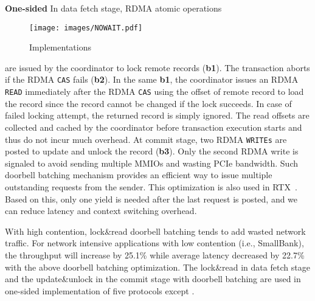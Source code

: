 {\bf One-sided }
In data fetch stage, RDMA atomic operations 
\setlength{\intextsep}{2pt}%
\setlength{\columnsep}{8pt}%
\begin{wrapfigure}[10]{r}{.50\linewidth}
    \centering
    \vspace{-0.4cm}
    \texttt{[image: images/NOWAIT.pdf]}
    \vspace{-0.8cm}
    \caption{\nowait Implementations}
     \vspace{-0.4cm}
    \label{fig:nowait}
\end{wrapfigure}
are issued by the coordinator to lock remote records (\step \textbf{b1}). The transaction aborts if the RDMA \texttt{CAS} fails (\step \textbf{b2}). In the same \step \textbf{b1}, the coordinator issues an RDMA \texttt{READ} immediately after the RDMA \texttt{CAS} using the offset of remote record to load the record
since the record cannot be changed if the lock succeeds. 
In case of failed locking attempt, the returned record is simply ignored. 
The read offsets are collected and cached by the coordinator before transaction execution starts and thus 
do not incur much overhead.
At commit stage, two RDMA \texttt{WRITEs} are posted to update and unlock the record (\step \textbf{b3}). Only the second RDMA write is signaled to avoid sending multiple MMIOs and wasting PCIe bandwidth. Such doorbell batching mechanism
provides an efficient way to issue multiple outstanding requests from the sender.
This optimization is also used in RTX~\cite{wei2018deconstructing}. 
Based on this, only one yield is needed after the last request is posted, and
we can reduce latency and context switching overhead.

With high contention, lock\&read doorbell batching tends to add 
wasted network traffic. For 
network intensive applications with low contention (i.e., SmallBank), the throughput will increase by 25.1\% while average latency decreased by 22.7\% 
with the above doorbell batching optimization.
The lock\&read in data fetch stage and the update\&unlock in the commit stage with doorbell batching are used in one-sided implementation of five protocols except \calvin. 


